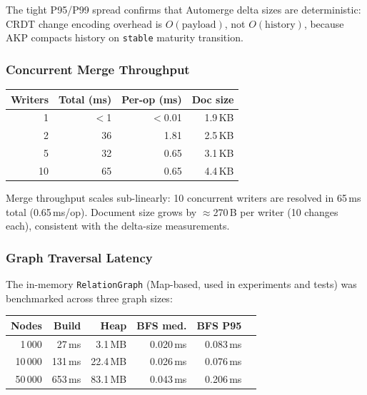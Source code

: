 \documentclass[10pt,twocolumn]{article}
\begin{document}
The tight P95/P99 spread confirms that Automerge delta sizes are
deterministic: CRDT change encoding overhead is $O(\text{payload})$, not
$O(\text{history})$, because AKP compacts history on \texttt{stable}
maturity transition.

\subsubsection*{Concurrent Merge Throughput}

\begin{center}
\small
\begin{tabular}{rrrr}
\toprule
\textbf{Writers} & \textbf{Total (ms)} & \textbf{Per-op (ms)} & \textbf{Doc size} \\
\midrule
 1 & $<$1   & $<$0.01 & 1.9\,KB \\
 2 &  36    &   1.81  & 2.5\,KB \\
 5 &  32    &   0.65  & 3.1\,KB \\
10 &  65    &   0.65  & 4.4\,KB \\
\bottomrule
\end{tabular}
\end{center}

Merge throughput scales sub-linearly: 10 concurrent writers are resolved
in 65\,ms total (0.65\,ms/op). Document size grows by $\approx$270\,B per
writer (10 changes each), consistent with the delta-size measurements.

\subsubsection*{Graph Traversal Latency}

The in-memory \texttt{RelationGraph} (Map-based, used in experiments and
tests) was benchmarked across three graph sizes:

\begin{center}
\small
\begin{tabular}{rrrrrr}
\toprule
\textbf{Nodes} & \textbf{Build} & \textbf{Heap} & \textbf{BFS med.} & \textbf{BFS P95} \\
\midrule
  1\,000 &   27\,ms &  3.1\,MB & 0.020\,ms & 0.083\,ms \\
 10\,000 &  131\,ms & 22.4\,MB & 0.026\,ms & 0.076\,ms \\
 50\,000 &  653\,ms & 83.1\,MB & 0.043\,ms & 0.206\,ms \\
\bottomrule
\end{tabular}
\end{center}
\end{document}
